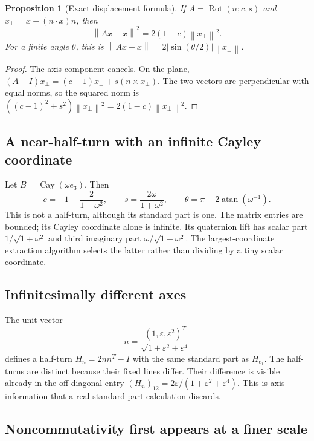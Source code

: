 \documentclass[11pt,letterpaper]{article}
\numberwithin{equation}{section}
\newtheorem{proposition}[proposition]{Proposition}
\theoremstyle{definition}
\theoremstyle{remark}
\newcommand{\eps}{\varepsilon}
\newcommand{\atan}{\operatorname{atan}}
\newcommand{\cay}{\operatorname{Cay}}
\newcommand{\Rot}{\operatorname{Rot}}
\newcommand{\norm}[1]{\left\lVert#1\right\rVert}
\newcommand{\abs}[1]{\left|#1\right|}
\begin{document}
\begin{proposition}[Exact displacement formula]\label{e3:so:prop:displacement}
If \(A=\Rot(n;c,s)\) and \(x_{\perp}=x-(n\cdot x)n\), then
\begin{equation}\label{e3:so:eq:displacement}
 \norm{Ax-x}^2=2(1-c)\norm{x_{\perp}}^2.
\end{equation}
For a finite angle \(\theta\), this is
\(\norm{Ax-x}=2\abs{\sin(\theta/2)}\norm{x_{\perp}}\).
\end{proposition}
\begin{proof}
The axis component cancels. On the plane,
\((A-I)x_{\perp}=(c-1)x_{\perp}+s(n\times x_{\perp})\).
The two vectors are perpendicular with equal norms, so the squared norm is
\(((c-1)^2+s^2)\norm{x_{\perp}}^2=2(1-c)\norm{x_{\perp}}^2\).
\end{proof}

\subsection{A near-half-turn with an infinite Cayley coordinate}

Let \(B=\cay(\omega e_3)\). Then
\[
 c=-1+\frac2{1+\omega^2},\qquad s=\frac{2\omega}{1+\omega^2},
 \qquad \theta=\pi-2\atan(\omega^{-1}).
\]
This is not a half-turn, although its standard part is one. The matrix entries
are bounded; its Cayley coordinate alone is infinite. Its quaternion lift has
scalar part \(1/\sqrt{1+\omega^2}\) and third imaginary part
\(\omega/\sqrt{1+\omega^2}\). The largest-coordinate extraction algorithm
selects the latter rather than dividing by a tiny scalar coordinate.

\subsection{Infinitesimally different axes}

The unit vector
\[
 n=\frac{(1,\eps,\eps^2)^T}{\sqrt{1+\eps^2+\eps^4}}
\]
defines a half-turn \(H_n=2nn^T-I\) with the same standard part as \(H_{e_1}\).
The half-turns are distinct because their fixed lines differ. Their difference
is visible already in the off-diagonal entry
\((H_n)_{12}=2\eps/(1+\eps^2+\eps^4)\). This is axis information that a real
standard-part calculation discards.

\subsection{Noncommutativity first appears at a finer scale}
\end{document}

